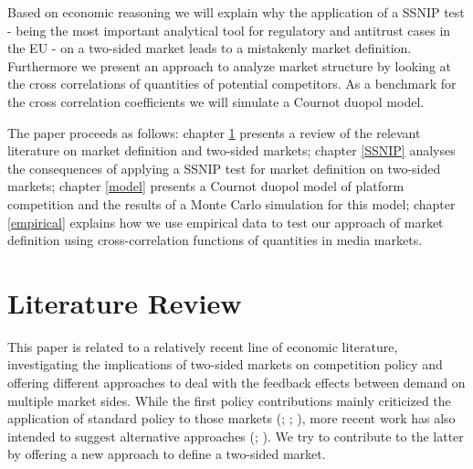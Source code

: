 \documentclass[10pt,a4paper]{scrreprt}
\begin{document}
Based on economic reasoning we will explain why the application of a SSNIP test - being the most important analytical tool for regulatory and antitrust cases in the EU - on a two-sided market leads to a mistakenly market definition. Furthermore we present an approach to analyze market structure by looking at the cross correlations of quantities of potential competitors. As a benchmark for the cross correlation coefficients we will simulate a Cournot duopol model. 

The paper proceeds as follows: chapter \ref{litrev} presents a review of the relevant literature on market definition and two-sided markets; chapter \ref{SSNIP} analyses the consequences of applying a SSNIP test for market definition on two-sided markets; chapter \ref{model} presents a Cournot duopol model of platform competition and the results of a Monte Carlo simulation for this model; chapter \ref{empirical}  explains how we use empirical data to test our approach of market definition using cross-correlation functions of quantities in media markets.  


\chapter{Literature Review}\label{litrev}
This paper is related to a relatively recent line of economic literature, investigating the implications of two-sided markets on competition policy and offering different approaches to deal with the feedback effects between demand on multiple market sides. While the first policy contributions mainly criticized the application of standard policy to those markets (\cite{wright_one-sided_2004}; \cite{leonello_horizontal_2010}; \cite{chandra_mergers_2009}), more recent work has also intended to suggest alternative approaches (\cite{argentesi_estimating_2007}; \cite{song_estimating_2015}). We try to contribute to the latter by offering a new approach to define a two-sided market. 
\end{document}
